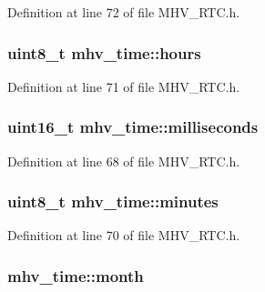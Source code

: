 \-Definition at line 72 of file \-M\-H\-V\-\_\-\-R\-T\-C.\-h.

\hypertarget{structmhv__time_a86216ab6b58bede2c74b8b38745c81f7}{
\subsubsection[{hours}]{\setlength{\rightskip}{0pt plus 5cm}uint8\-\_\-t {\bf mhv\-\_\-time\-::hours}}}
\label{structmhv__time_a86216ab6b58bede2c74b8b38745c81f7}


\-Definition at line 71 of file \-M\-H\-V\-\_\-\-R\-T\-C.\-h.

\hypertarget{structmhv__time_a88f1e6b1d010c2f21b11bd335b1fae65}{
\subsubsection[{milliseconds}]{\setlength{\rightskip}{0pt plus 5cm}uint16\-\_\-t {\bf mhv\-\_\-time\-::milliseconds}}}
\label{structmhv__time_a88f1e6b1d010c2f21b11bd335b1fae65}


\-Definition at line 68 of file \-M\-H\-V\-\_\-\-R\-T\-C.\-h.

\hypertarget{structmhv__time_a72c1e9925d2d3de254c6550c0b309347}{
\subsubsection[{minutes}]{\setlength{\rightskip}{0pt plus 5cm}uint8\-\_\-t {\bf mhv\-\_\-time\-::minutes}}}
\label{structmhv__time_a72c1e9925d2d3de254c6550c0b309347}


\-Definition at line 70 of file \-M\-H\-V\-\_\-\-R\-T\-C.\-h.

\hypertarget{structmhv__time_a832c57e459789022fb39b7c704a3e926}{
\subsubsection[{month}]{ {\bf mhv\-\_\-time\-::month}}}
\label{structmhv__time_a832c57e459789022fb39b7c704a3e926}


